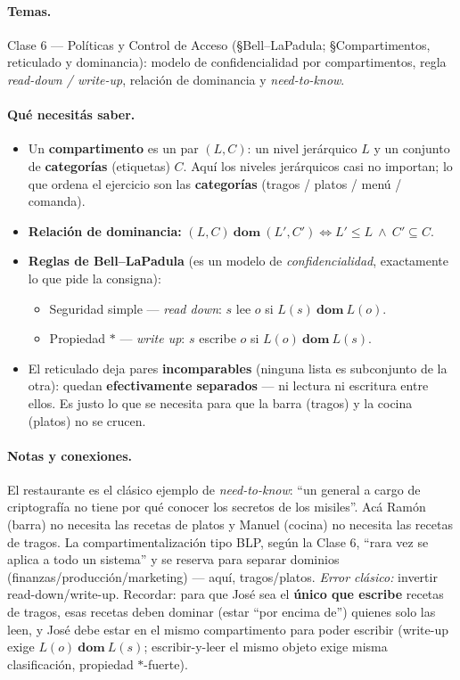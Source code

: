 \paragraph{Temas.}
Clase 6 — Políticas y Control de Acceso (\S Bell--LaPadula; \S Compartimentos, reticulado y dominancia): modelo de confidencialidad por compartimentos, regla \emph{read-down / write-up}, relación de dominancia y \emph{need-to-know}.

\paragraph{Qué necesitás saber.}
\begin{itemize}
  \item Un \textbf{compartimento} es un par $(L, C)$: un nivel jerárquico $L$ y un conjunto de \textbf{categorías} (etiquetas) $C$. Aquí los niveles jerárquicos casi no importan; lo que ordena el ejercicio son las \textbf{categorías} (tragos / platos / menú / comanda).
  \item \textbf{Relación de dominancia:} $(L,C)\ \mathbf{dom}\ (L',C') \iff L'\le L \ \wedge\ C'\subseteq C$.
  \item \textbf{Reglas de Bell--LaPadula} (es un modelo de \emph{confidencialidad}, exactamente lo que pide la consigna):
  \begin{itemize}
    \item Seguridad simple — \emph{read down}: $s$ lee $o$ si $L(s)\ \mathbf{dom}\ L(o)$.
    \item Propiedad $\ast$ — \emph{write up}: $s$ escribe $o$ si $L(o)\ \mathbf{dom}\ L(s)$.
  \end{itemize}
  \item El reticulado deja pares \textbf{incomparables} (ninguna lista es subconjunto de la otra): quedan \textbf{efectivamente separados} — ni lectura ni escritura entre ellos. Es justo lo que se necesita para que la barra (tragos) y la cocina (platos) no se crucen.
\end{itemize}

\paragraph{Notas y conexiones.}
El restaurante es el clásico ejemplo de \emph{need-to-know}: ``un general a cargo de criptografía no tiene por qué conocer los secretos de los misiles''. Acá Ramón (barra) no necesita las recetas de platos y Manuel (cocina) no necesita las recetas de tragos. La compartimentalización tipo BLP, según la Clase 6, ``rara vez se aplica a todo un sistema'' y se reserva para separar dominios (finanzas/producción/marketing) — aquí, tragos/platos. \emph{Error clásico:} invertir read-down/write-up. Recordar: para que José sea el \textbf{único que escribe} recetas de tragos, esas recetas deben dominar (estar ``por encima de'') quienes solo las leen, y José debe estar en el mismo compartimento para poder escribir (write-up exige $L(o)\ \mathbf{dom}\ L(s)$; escribir-y-leer el mismo objeto exige misma clasificación, propiedad $\ast$-fuerte).

